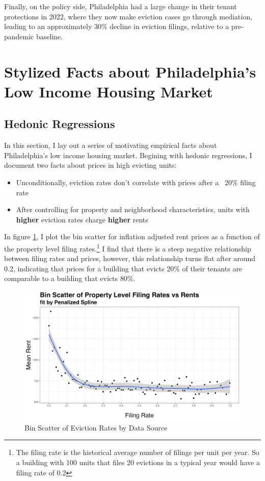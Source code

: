\documentclass{article}
\begin{document}
Finally, on the policy side, Philadelphia had a large change in their tenant protections in 2022, where they now make eviction cases go through mediation, leading to an approximately 30\% decline in eviction filings, relative to a pre-pandemic baseline.

\clearpage

\section{Stylized Facts about Philadelphia's Low Income Housing Market}

\subsection{Hedonic Regressions}
In this section, I lay out a series of motivating empirical facts about Philadelphia's low income housing market. Begining with hedonic regressions, I document two facts about prices in high evicting units:

\begin{itemize}
    \item Unconditionally, eviction rates don't correlate with prices after a ~20\% filing rate
        \item After controlling for property and neighborhood characteristics, units with \textbf{higher} eviction rates charge \textbf{higher} rents 
\end{itemize}

In figure \ref{fig:bin-scatter}, I plot the bin scatter for inflation adjusted rent prices as a function of the property level filing rates.\footnote{The filing rate is the historical average number of filings per unit per year. So a building with 100 units that files 20 evictions in a typical year would have a filing rate of 0.2} I find that there is a steep negative relationship between filing rates and prices, however, this relationship turns flat after around 0.2, indicating that prices for a building that evicts 20\% of their tenants are comparable to a building that evicts 80\%.

\begin{figure}[htbp]
        \centering
        \includegraphics[width=1\linewidth]{figs/philadelphia_filing_rate_rent_scatter.png}
        \caption{Bin Scatter of Eviction Rates by Data Source}
        \label{fig:bin-scatter}
    \end{figure}
\end{document}
